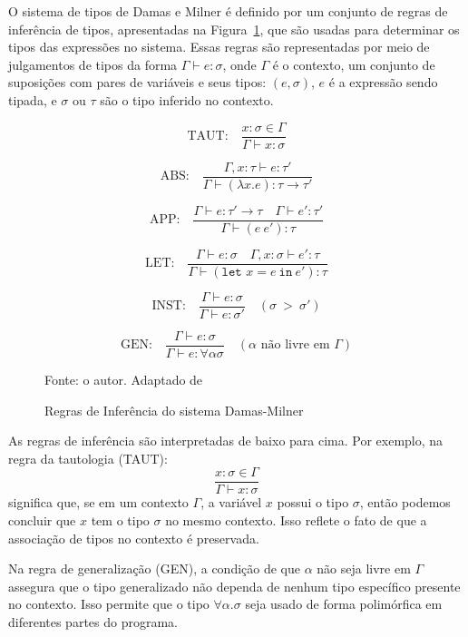 O sistema de tipos de Damas e Milner é definido por um conjunto de regras de inferência de tipos, apresentadas na Figura~\ref{eq:type-inference}, que são usadas para determinar os tipos das expressões no sistema.
Essas regras são representadas por meio de julgamentos de tipos da forma $\Gamma \vdash e: \sigma$, onde $\Gamma$ é o contexto, um conjunto de suposições com pares de variáveis e seus tipos: $(e, \sigma)$, $e$ é a expressão sendo tipada, e $\sigma$ ou $\tau$ são o tipo inferido no contexto.

\begin{figure}[ht!]
  \caption{Regras de Inferência do sistema Damas-Milner}
  \centering
  \[
    \text{TAUT:} \quad \frac{x : \sigma \in \Gamma}{\Gamma \vdash x : \sigma}
  \]

  \[
    \text{ABS:} \quad \frac{\Gamma, x : \tau \vdash e : \tau'}{\Gamma \vdash (\lambda x. e) : \tau \to \tau'}
  \]

  \[
    \text{APP:} \quad \frac{\Gamma \vdash e : \tau' \to \tau \quad \Gamma \vdash e' : \tau'}{\Gamma \vdash (e \ e') : \tau}
  \]

  \[
    \text{LET:} \quad \frac{\Gamma \vdash e : \sigma \quad \Gamma, x : \sigma \vdash e' : \tau}{\Gamma \vdash (\texttt{let } x = e \ \texttt{in} \ e') : \tau}
  \]

  \[
    \text{INST:} \quad \frac{\Gamma \vdash e : \sigma}{\Gamma \vdash e : \sigma'} \quad \scriptstyle (\sigma\ >\ \sigma')
  \]

  \[
    \text{GEN:} \quad \frac{\Gamma \vdash e : \sigma}{\Gamma \vdash e : \forall \alpha \sigma} \quad \scriptstyle (\alpha \text{ não livre em } \Gamma)
  \]

  \small{Fonte: o autor. Adaptado de~\cite{DAMAS1982}}\label{eq:type-inference}
\end{figure}

As regras de inferência são interpretadas de baixo para cima.
Por exemplo, na regra da tautologia (TAUT):
\[
  \frac{x : \sigma \in \Gamma}{\Gamma \vdash x : \sigma}
\]
significa que, se em um contexto $\Gamma$, a variável $x$ possui o tipo $\sigma$, então podemos concluir que $x$ tem o tipo $\sigma$ no mesmo contexto.
Isso reflete o fato de que a associação de tipos no contexto é preservada.

Na regra de generalização (GEN), a condição de que $\alpha$ não seja livre em $\Gamma$ assegura que o tipo generalizado não dependa de nenhum tipo específico presente no contexto.
Isso permite que o tipo $\forall \alpha. \sigma$ seja usado de forma polimórfica em diferentes partes do programa.

